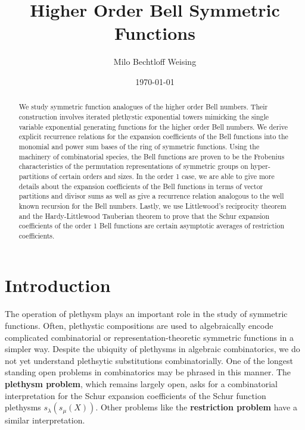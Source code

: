 \documentclass[12pt,reqno]{amsart}
\title{Higher Order Bell Symmetric Functions}
\author{Milo Bechtloff Weising}
\date{\today}
\theoremstyle{definition}
\begin{document}
\maketitle 

\begin{abstract}
    We study symmetric function analogues of the higher order Bell numbers. Their construction involves iterated plethystic exponential towers mimicking the single variable exponential generating functions for the higher order Bell numbers. We derive explicit recurrence relations for the expansion coefficients of the Bell functions into the monomial and power sum bases of the ring of symmetric functions. Using the machinery of combinatorial species, the Bell functions are proven to be the Frobenius characteristics of the permutation representations of symmetric groups on hyper-partitions of certain orders and sizes. In the order 1 case, we are able to give more details about the expansion coefficients of the Bell functions in terms of vector partitions and divisor sums as well as give a recurrence relation analogous to the well known recursion for the Bell numbers. Lastly, we use Littlewood's reciprocity theorem and the Hardy-Littlewood Tauberian theorem to prove that the Schur expansion coefficients of the order 1 Bell functions are certain asymptotic averages of restriction coefficients.
\end{abstract}
\tableofcontents

\section{Introduction}

The operation of plethysm plays an important role
in the study of symmetric functions. Often, plethystic compositions are used to algebraically encode complicated combinatorial or representation-theoretic symmetric functions in a simpler way. Despite the ubiquity of plethysms in algebraic combinatorics, we do not yet understand plethsytic substitutions combinatorially. One of the longest standing open problems in combinatorics may be phrased in this manner. The \textbf{plethysm problem}, which remains largely open, asks for a combinatorial interpretation for the Schur expansion coefficients of the Schur function plethysms $s_{\lambda}(s_{\mu}(X)).$ Other problems like the \textbf{restriction problem} have a similar interpretation. 
\end{document}

